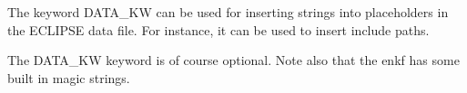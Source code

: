 \documentclass[letterpaper,10pt,english]{sphinxmanual}
\begin{document}
\label{\detokenize{keywords/index:data-kw}}
\begin{sphinxShadowBox}

The keyword DATA\_KW can be used for inserting strings into placeholders in the
ECLIPSE data file. For instance, it can be used to insert include paths.


%
\begin{sphinxVerbatim}[commandchars=\\\{\}]
             
           
     
    
\end{sphinxVerbatim}

The DATA\_KW keyword is of course optional. Note also that the enkf has some
built in magic strings.
\end{sphinxShadowBox}
\label{\detokenize{keywords/index:delete-runpath}}
\end{document}
